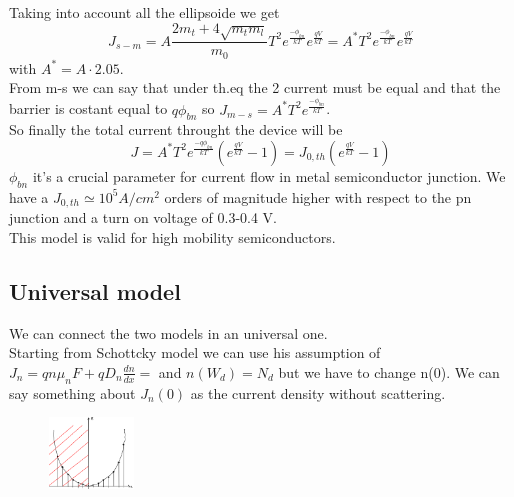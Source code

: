 Taking into account all the ellipsoide we get
\begin{equation}
J_{s-m}=A \frac{2m_t+4\sqrt{m_tm_l}}{m_0}T^2e^{\frac{-\phi_{bn}}{kT}}e^{\frac{qV}{kT}}=A^*T^2e^{\frac{-\phi_{bn}}{kT}}e^{\frac{qV}{kT}}
\end{equation}
with $A^*=A\cdot2.05$.\\
From m-s we can say that under th.eq the 2 current must be equal and that the barrier is costant equal to $q\phi_{bn}$ so $J_{m-s}=A^*T^2e^{\frac{-\phi_{bn}}{kT}}$.\\
So finally the total current throught the device will be 
\begin{equation}
J=A^*T^2e^{\frac{-q\phi_{bn}}{kT}}(e^{\frac{qV}{kT}}-1)=J_{0,th}(e^{\frac{qV}{kT}}-1)
\end{equation}
$\phi_{bn}$ it's a crucial parameter for current flow in metal semiconductor junction. We have a $J_{0,th}\simeq10^5 A/cm^2$ orders of magnitude higher with respect to the pn junction and a turn on voltage of 0.3-0.4 V.\\
This model is valid for high mobility semiconductors.\\

\subsection{Universal model}

We can connect the two models in an universal one.\\
Starting from Schottcky model we can use his assumption of $ J_n=qn\mu_nF+qD_n \frac{dn}{dx}=$ and $n(W_d)=N_d$ but we have to change n(0). We can say something about $J_n(0)$ as the current density without scattering.

\begin{figure}
\includegraphics[width=0.2\textwidth]{generalmsmodel.png}
\end{figure}
 
